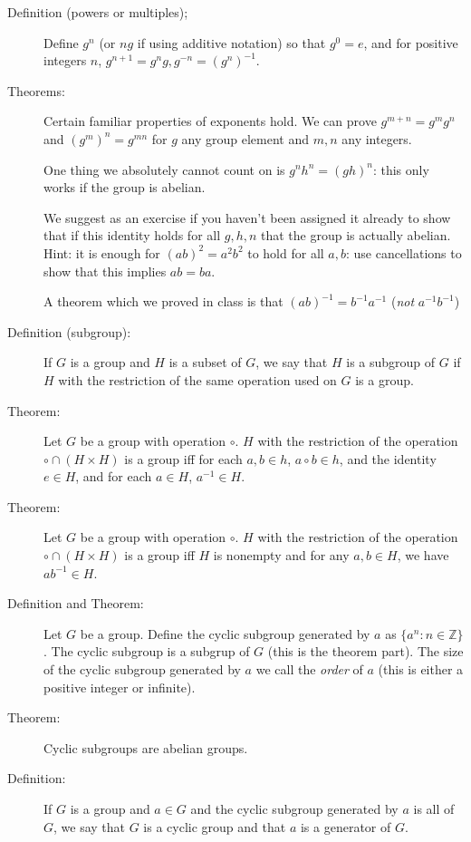 \documentclass[12pt]{article}
\begin{document}
\begin{description}
\item[Definition (powers or multiples);]  Define $g^n$ (or $ng$ if using additive notation) so that $g^0 = e$, and for positive integers $n$, $g^{n+1} = g^ng, g^{-n} = (g^n)^{-1}$.

\item[Theorems:]  Certain familiar properties of exponents hold.  We can prove $g^{m+n} = g^mg^n$ and $(g^m)^n = g^{mn}$ for $g$ any group element and $m,n$ any integers.

One thing we absolutely cannot count on is $g^nh^n = (gh)^n$:  this only works if the group is abelian.

We suggest as an exercise if you haven't been assigned it already to show that if this identity holds for all $g,h,n$ that the group is actually abelian. Hint:  it is enough for $(ab)^2 = a^2b^2$ to hold for all $a,b$:  use cancellations to show that this implies $ab=ba$.

A theorem which we proved in class is that $(ab)^{-1} = b^{-1}a^{-1}$ ({\em not\/} $a^{-1}b^{-1}$)

\item[Definition (subgroup):]  If $G$ is a group and $H$ is a subset of $G$, we say that $H$ is a subgroup of $G$ if $H$ with the restriction of the same operation used on $G$ is a group.

\item[Theorem:]  Let $G$ be a group with operation $\circ$.  $H$ with the restriction of the operation $\circ \cap (H \times H)$ is a group iff for each $a,b \in h$, $a\circ b \in h$, and the identity $e \in H$,
and for each $a \in H$, $a^{-1} \in H$.

\item[Theorem:]  Let $G$ be a group with operation $\circ$.  $H$ with the restriction of the operation $\circ \cap (H \times H)$ is a group iff $H$ is nonempty and for any $a,b \in H$, we have $ab^{-1} \in H$.

\item[Definition and Theorem:]  Let $G$ be a group.  Define the cyclic subgroup generated by $a$ as $\{a^n:n \in {\mathbb Z}\}$.  The cyclic subgroup is a subgrup of $G$ (this is the theorem part).  The size of the cyclic subgroup generated by $a$ we call the {\em order\/} of $a$ (this is either a positive integer or infinite).

\item[Theorem:]  Cyclic subgroups are abelian groups.

\item[Definition:]  If $G$ is a group and $a \in G$ and the cyclic subgroup generated by $a$ is all of $G$, we say that $G$ is a cyclic group and that $a$ is a generator of $G$.

\end{description}
\end{document}
